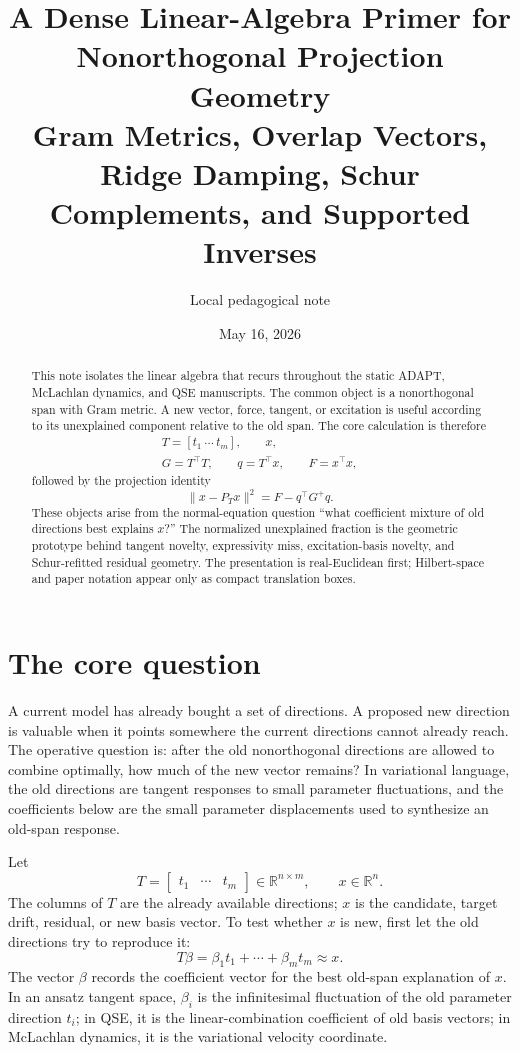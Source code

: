 \documentclass[10pt,twocolumn]{article}
\title{A Dense Linear-Algebra Primer for Nonorthogonal Projection Geometry\\[-1mm]
\large Gram Metrics, Overlap Vectors, Ridge Damping, Schur Complements, and Supported Inverses}
\author{Local pedagogical note}
\date{May 16, 2026}
\newcommand{\R}{\mathbb R}
\begin{document}
\maketitle

\begin{abstract}
This note isolates the linear algebra that recurs throughout the static ADAPT, McLachlan dynamics, and QSE manuscripts. The common object is a nonorthogonal span with Gram metric. A new vector, force, tangent, or excitation is useful according to its unexplained component relative to the old span. The core calculation is therefore
\[
\begin{gathered}
T=[t_1\ \cdots\ t_m],\qquad x,\\[-1mm]
G=T^\top T,\qquad q=T^\top x,\qquad F=x^\top x,
\end{gathered}
\]
followed by the projection identity
\[
\|x-P_Tx\|^2=F-q^\top G^+q.
\]
These objects arise from the normal-equation question ``what coefficient mixture of old directions best explains \(x\)?'' The normalized unexplained fraction is the geometric prototype behind tangent novelty, expressivity miss, excitation-basis novelty, and Schur-refitted residual geometry. The presentation is real-Euclidean first; Hilbert-space and paper notation appear only as compact translation boxes.
\end{abstract}

\section{The core question}

\begin{intuitionbox}
A current model has already bought a set of directions. A proposed new direction is valuable when it points somewhere the current directions cannot already reach. The operative question is: after the old nonorthogonal directions are allowed to combine optimally, how much of the new vector remains? In variational language, the old directions are tangent responses to small parameter fluctuations, and the coefficients below are the small parameter displacements used to synthesize an old-span response.
\end{intuitionbox}

Let
\begin{equation}
T=\begin{bmatrix}t_1&\cdots&t_m\end{bmatrix}\in\R^{n\times m},
\qquad x\in\R^n.
\label{eq:primitive_Tx}
\end{equation}
The columns of $T$ are the already available directions; $x$ is the candidate, target drift, residual, or new basis vector. To test whether \(x\) is new, first let the old directions try to reproduce it:
\begin{equation}
T\beta
=\beta_1t_1+\cdots+\beta_m t_m
\approx x.
\label{eq:old_span_synthesis}
\end{equation}
The vector \(\beta\) records the coefficient vector for the best old-span explanation of \(x\). In an ansatz tangent space, \(\beta_i\) is the infinitesimal fluctuation of the old parameter direction \(t_i\); in QSE, it is the linear-combination coefficient of old basis vectors; in McLachlan dynamics, it is the variational velocity coordinate.
\end{document}
